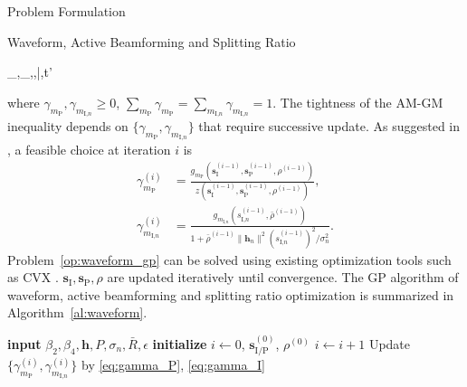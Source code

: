 \documentclass[journal]{IEEEtran}
\begin{document}
\begin{section}{Problem Formulation}
\begin{subsection}{Waveform, Active Beamforming and Splitting Ratio}
			\begin{mini!}
				{_{},_,\rho,\bar{\rho},t'}{}{\label{op:waveform_gp}}{}
			\end{mini!}
			where $\gamma_{m_\text{P}},\gamma_{m_{\text{I,}n}} \ge 0$, $\sum_{m_\text{P}}\gamma_{m_\text{P}}=\sum_{m_{\text{I,}n}}\gamma_{m_{\text{I,}n}}=1$. The tightness of the AM-GM inequality depends on $\{\gamma_{m_\text{P}},\gamma_{m_{\text{I,}n}}\}$ that require successive update. As suggested in \cite{Clerckx2018b}, a feasible choice at iteration $i$ is
			\begin{align}
				\gamma_{m_\text{P}}^{(i)} & = \frac{g_{m_\text{P}}(\boldsymbol{s}_{\text{I}}^{(i-1)},\boldsymbol{s}_\text{P}^{(i-1)},\rho^{(i-1)})}{z(\boldsymbol{s}_{\text{I}}^{(i-1)},\boldsymbol{s}_\text{P}^{(i-1)},\rho^{(i-1)})}\label{eq:gamma_P},\\
				\gamma_{m_{\text{I,}n}}^{(i)} & = \frac{g_{m_{\text{I,}n}}(s_{\text{I,}n}^{(i-1)},\bar{\rho}^{(i-1)})}{1+{\bar{\rho}^{(i-1)}\lVert{\boldsymbol{h}_n}\rVert^2 (s_{\text{I,}n}^{(i-1)})^2}\big/{\sigma_n^2}}.\label{eq:gamma_I}
			\end{align}
			Problem~\eqref{op:waveform_gp} can be solved using existing optimization tools such as CVX \cite{Grant2013}. $\boldsymbol{s}_{\text{I}},\boldsymbol{s}_\text{P},\rho$ are updated iteratively until convergence. The GP algorithm of waveform, active beamforming and splitting ratio optimization is summarized in Algorithm~\ref{al:waveform}.
			\begin{algorithm}[!t]
				\caption{GP: Waveform, Active Beamforming and Splitting Ratio.}
				\label{al:waveform}
				\begin{algorithmic}[1]
					\State \textbf{input} $\beta_2,\beta_4,\boldsymbol{h},P,\sigma_n,\bar{R},\epsilon$
					\State \textbf{initialize} $i \gets 0$, $\boldsymbol{s}_{\text{I/P}}^{(0)}$, $\rho^{(0)}$
					\Repeat
						\State $i \gets i + 1$
						\State Update $\{\gamma_{m_\text{P}}^{(i)},\gamma_{m_{\text{I,}n}}^{(i)}\}$ by \eqref{eq:gamma_P}, \eqref{eq:gamma_I}

\end{algorithmic}
\end{algorithm}
\end{subsection}
\end{section}
\end{document}
